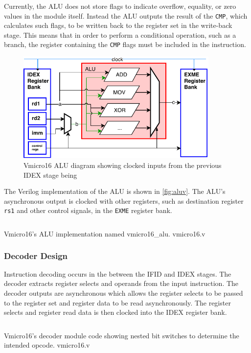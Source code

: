 Currently, the ALU does not store flags to indicate overflow, equality, or zero values in the module itself. Instead the ALU outputs the result of the \verb|CMP|, which calculates such flags, to be written back to the register set in the write-back stage. This means that in order to perform a conditional operation, such as a branch, the register containing the \verb|CMP| flags must be included in the instruction.

\begin{figure}[H]
\centering 
\includegraphics[width=10cm]{../img/alu}
\caption{Vmicro16 ALU diagram showing clocked inputs from the previous IDEX stage being }
\label{fig:alu}
\end{figure}


The Verilog implementation of the ALU is shown in \cref{fig:aluv}. The ALU's asynchronous output is clocked with other registers, such as destination register \verb|rs1| and other control signals, in the \verb|EXME| register bank.
\begin{listing}[H]
\centering
\inputminted[fontsize=\footnotesize,firstline=322,lastline=335,linenos]{verilog}{../../vmicro16/vmicro16.v}
\caption{Vmicro16's ALU implementation named vmicro16\_alu. vmicro16.v}
\label{fig:aluv}
\end{listing}




\subsubsection{Decoder Design}
Instruction decoding occurs in the between the IFID and IDEX stages. 
The decoder extracts register selects and operands from the input instruction. The decoder outputs are asynchronous which allows the register selects to be passed to the register set and register data to be read asynchronously. The register selects and register read data is then clocked into the IDEX register bank.

\begin{listing}[H]
\centering
\inputminted[fontsize=\footnotesize,firstline=224,lastline=245,linenos]{verilog}{../../vmicro16/vmicro16.v}
\caption{Vmicro16's decoder module code showing nested bit switches to determine the intended opcode. vmicro16.v}
\label{fig:decoder}
\end{listing}

